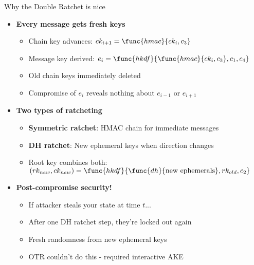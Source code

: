 \documentclass[aspectratio=169, lualatex, handout]{beamer}
\begin{document}
\begin{frame}{Why the Double Ratchet is nice}
	\begin{itemize}
		\item \textbf{Every message gets fresh keys}
		      \begin{itemize}
			      \item Chain key advances: $ck_{i+1} = \func{hmac}{ck_i, c_3}$
			      \item Message key derived: $e_i = \func{hkdf}{\func{hmac}{ck_i, c_3}, c_1, c_4}$
			      \item Old chain keys immediately deleted
			      \item Compromise of $e_i$ reveals nothing about $e_{i-1}$ or $e_{i+1}$
		      \end{itemize}
		\item \textbf{Two types of ratcheting}
		      \begin{itemize}
			      \item \textbf{Symmetric ratchet}: HMAC chain for immediate messages
			      \item \textbf{DH ratchet}: New ephemeral keys when direction changes
			      \item Root key combines both: $(rk_{new}, ck_{new}) = \func{hkdf}{\func{dh}{\text{new ephemerals}}, rk_{old}, c_2}$
		      \end{itemize}
		\item \textbf{Post-compromise security!}
		      \begin{itemize}
			      \item If attacker steals your state at time $t$...
			      \item After one DH ratchet step, they're locked out again
			      \item Fresh randomness from new ephemeral keys
			      \item OTR couldn't do this - required interactive AKE
		      \end{itemize}
	\end{itemize}
\end{frame}
\end{document}
